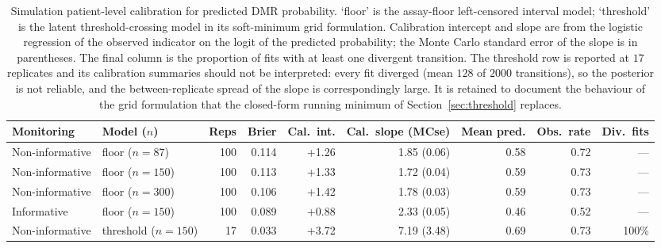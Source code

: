 \begin{table}[!htbp]
\centering
\caption{Simulation patient-level calibration for predicted DMR probability. `floor' is the assay-floor left-censored interval model; `threshold' is the latent threshold-crossing model in its soft-minimum grid formulation. Calibration intercept and slope are from the logistic regression of the observed indicator on the logit of the predicted probability; the Monte Carlo standard error of the slope is in parentheses. The final column is the proportion of fits with at least one divergent transition. The threshold row is reported at $17$ replicates and its calibration summaries should not be interpreted: every fit diverged (mean $128$ of $2000$ transitions), so the posterior is not reliable, and the between-replicate spread of the slope is correspondingly large. It is retained to document the behaviour of the grid formulation that the closed-form running minimum of Section~\ref{sec:threshold} replaces.}
\label{tab:sim-calibration}
\small
\begin{tabular}{llrrrrrrr}
\toprule
Monitoring & Model ($n$) & Reps & Brier & Cal.\ int. & Cal.\ slope (MCse) & Mean pred. & Obs.\ rate & Div.\ fits\\
\midrule
Non-informative & floor ($n{=}87$) & 100 & 0.114 & +1.26 & 1.85 (0.06) & 0.58 & 0.72 & ---\\
Non-informative & floor ($n{=}150$) & 100 & 0.113 & +1.33 & 1.72 (0.04) & 0.59 & 0.73 & ---\\
Non-informative & floor ($n{=}300$) & 100 & 0.106 & +1.42 & 1.78 (0.03) & 0.59 & 0.73 & ---\\
Informative & floor ($n{=}150$) & 100 & 0.089 & +0.88 & 2.33 (0.05) & 0.46 & 0.52 & ---\\
Non-informative & threshold ($n{=}150$) & 17 & 0.033 & +3.72 & 7.19 (3.48) & 0.69 & 0.73 & 100\%\\
\bottomrule
\end{tabular}
\end{table}
